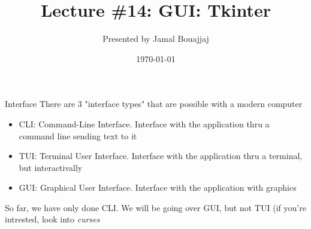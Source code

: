 %
%



\usepackage{media9}
\usepackage{multicol}

\title{Lecture \#14: GUI: Tkinter}
\date{\today}
\author{Presented by Jamal Bouajjaj}

\makeatletter
{}%
\makeatother



\maketitle

\begin{frame}{Interface}
There are 3 "interface types" that are possible with a modern computer
\begin{itemize}
  \item CLI: Command-Line Interface. Interface with the application thru a command line sending text to it
  \item TUI: Terminal User Interface. Interface with the application thru a terminal, but interactivally
  \item GUI: Graphical User Interface. Interface with the application with graphics
\end{itemize}
So far, we have only done CLI. We will be going over GUI, but not TUI (if you're intrested, look into \textit{curses}
\end{frame}


